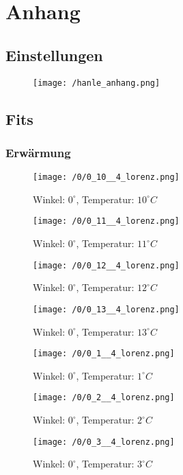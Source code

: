 \newpage
\section{Anhang}
\subsection{Einstellungen}
\begin{figure}[h]
\centering
\texttt{[image: /hanle\_anhang.png]}
\end{figure}
\clearpage
\subsection{Fits}
\subsubsection{Erwärmung}
\begin{figure}[h]
\centering
\texttt{[image: /0/0\_10\_\_4\_lorenz.png]}
\caption{Winkel: $ 0^\circ$, Temperatur: $ 10^\circ C$}
\end{figure}
\begin{figure}[h]
\centering
\texttt{[image: /0/0\_11\_\_4\_lorenz.png]}
\caption{Winkel: $ 0^\circ$, Temperatur: $ 11^\circ C$}
\end{figure}
\clearpage
\begin{figure}[c]
\centering
\texttt{[image: /0/0\_12\_\_4\_lorenz.png]}
\caption{Winkel: $ 0^\circ$, Temperatur: $ 12^\circ C$}
\end{figure}
\begin{figure}[c]
\centering
\texttt{[image: /0/0\_13\_\_4\_lorenz.png]}
\caption{Winkel: $ 0^\circ$, Temperatur: $ 13^\circ C$}
\end{figure}
\clearpage
\begin{figure}[c]
\centering
\texttt{[image: /0/0\_1\_\_4\_lorenz.png]}
\caption{Winkel: $ 0^\circ$, Temperatur: $ 1^\circ C$}
\end{figure}
\begin{figure}[c]
\centering
\texttt{[image: /0/0\_2\_\_4\_lorenz.png]}
\caption{Winkel: $ 0^\circ$, Temperatur: $ 2^\circ C$}
\end{figure}
\clearpage
\begin{figure}[c]
\centering
\texttt{[image: /0/0\_3\_\_4\_lorenz.png]}
\caption{Winkel: $ 0^\circ$, Temperatur: $ 3^\circ C$}
\end{figure}
